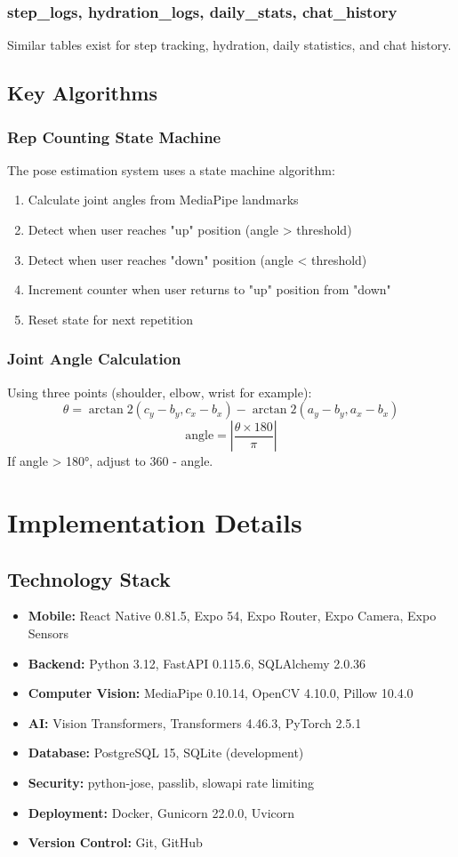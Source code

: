 \documentclass[12pt]{report}
\begin{document}
\subsection*{step\_logs, hydration\_logs, daily\_stats, chat\_history}
Similar tables exist for step tracking, hydration, daily statistics, and chat history.

\section{Key Algorithms}
\subsection{Rep Counting State Machine}
The pose estimation system uses a state machine algorithm:
\begin{enumerate}
    \item Calculate joint angles from MediaPipe landmarks
    \item Detect when user reaches "up" position (angle > threshold)
    \item Detect when user reaches "down" position (angle < threshold)
    \item Increment counter when user returns to "up" position from "down"
    \item Reset state for next repetition
\end{enumerate}

\subsection{Joint Angle Calculation}
Using three points (shoulder, elbow, wrist for example):
$$\theta = \arctan2(c_y - b_y, c_x - b_x) - \arctan2(a_y - b_y, a_x - b_x)$$
$$\text{angle} = \left|\frac{\theta \times 180}{\pi}\right|$$
If angle > 180°, adjust to 360 - angle.

\chapter{Implementation Details}
\section{Technology Stack}
\begin{itemize}
    \item \textbf{Mobile:} React Native 0.81.5, Expo 54, Expo Router, Expo Camera, Expo Sensors
    \item \textbf{Backend:} Python 3.12, FastAPI 0.115.6, SQLAlchemy 2.0.36
    \item \textbf{Computer Vision:} MediaPipe 0.10.14, OpenCV 4.10.0, Pillow 10.4.0
    \item \textbf{AI:} Vision Transformers, Transformers 4.46.3, PyTorch 2.5.1
    \item \textbf{Database:} PostgreSQL 15, SQLite (development)
    \item \textbf{Security:} python-jose, passlib, slowapi rate limiting
    \item \textbf{Deployment:} Docker, Gunicorn 22.0.0, Uvicorn
    \item \textbf{Version Control:} Git, GitHub
\end{itemize}
\end{document}
